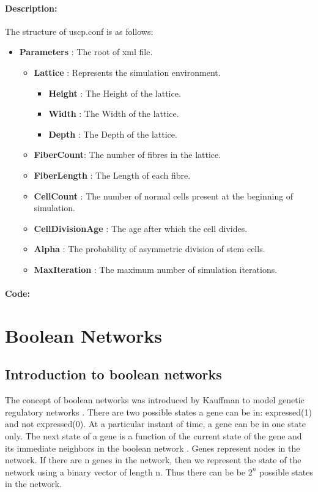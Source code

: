 \documentclass[11pt]{report}
\begin{document}
  \subsubsection{\color{green}Description: }
  The structure of uscp.conf is as follows:
  \begin{itemize}
   \item \textbf{Parameters} : The root of xml file.
   \begin{itemize}
    \item \textbf{Lattice} : Represents the simulation environment.
    \begin{itemize}
     \item \textbf{Height} : The Height of the lattice.
     \item \textbf{Width} : The Width of the lattice.
     \item \textbf{Depth} : The Depth of the lattice.
    \end{itemize}

    \item \textbf{FiberCount}: The number of fibres in the lattice.
    \item \textbf{FiberLength} : The Length of each fibre.
    \item \textbf{CellCount} : The number of normal cells present at the beginning of simulation.
    \item \textbf{CellDivisionAge} : The age after which the cell divides.
    \item \textbf{Alpha} : The probability of asymmetric division of stem cells.
    \item \textbf{MaxIteration} : The maximum number of simulation iterations.

   \end{itemize}

  \end{itemize}
  
  \subsubsection{\color{green}Code: }
  \lstset{language=XML}
  


  \chapter{Boolean Networks}
  \section{\color{red} Introduction to boolean networks}
    The concept of boolean networks was introduced by Kauffman to model genetic regulatory networks \cite{Goles2010,Kauffman1969}.
    There are two possible states a gene can be in: expressed(1) and not expressed(0). At a particular instant of time, a gene can
    be in one state only. The next state of a gene is a function of the current state of the gene and its immediate neighbors
    in the boolean network \cite{Dimitrova2011}. Genes represent nodes in the network. If there are n genes in the network, then we represent the state of the network using a binary vector
    of length n. Thus there can be be $2^n$ possible states in the network.
    
\end{document}
